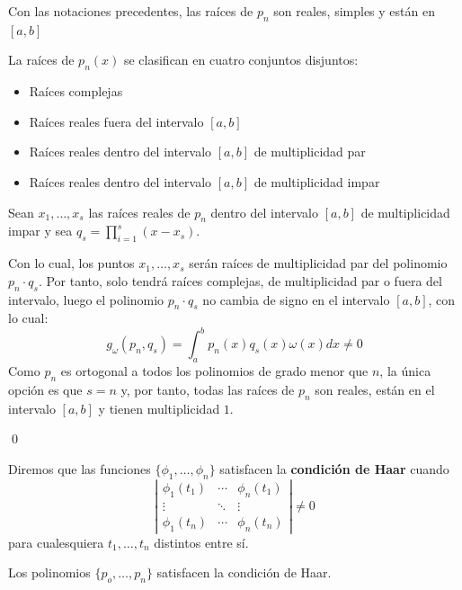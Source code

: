  \begin{prop}
Con las notaciones precedentes, las raíces de $p_n$ son reales, simples y están en $[a,b]$
 \end{prop}
 \begin{dem}
 La raíces de $p_n(x)$ se clasifican en cuatro conjuntos disjuntos: \vspace{-5mm}
 \begin{itemize}
 \item[a)] Raíces complejas
 \item[b)] Raíces reales fuera del intervalo $[a,b]$
 \item[c)] Raíces reales dentro del intervalo $[a,b]$ de multiplicidad par
 \item[d)] Raíces reales dentro del intervalo $[a,b]$ de multiplicidad impar
 \end{itemize}
 Sean $x_1,\ldots,x_s$ las raíces reales de $p_n$ dentro del intervalo $[a,b]$ de multiplicidad impar y sea $q_s=\prod_{i=1}^s(x-x_s)$.
 
 Con lo cual, los puntos $x_1,\ldots,x_s$ serán raíces de multiplicidad par del polinomio $p_{n}\cdot q_s$. Por tanto, solo tendrá raíces complejas, de multiplicidad par o fuera del intervalo, luego el polinomio $p_{n}\cdot q_s$ no cambia de signo en el intervalo $[a,b]$, con lo cual:
 $$g_{\omega}(p_n,q_s)=\int_{a}^bp_n(x)q_s(x)\omega(x)dx\neq 0$$
 Como $p_n$ es ortogonal a todos los polinomios de grado menor que $n$, la única opción es que $s=n$ y, por tanto, todas las raíces de $p_n$ son reales, están en el intervalo $[a,b]$ y tienen multiplicidad $1$.
 
 \qed\end{dem}
 \begin{defin}
    Diremos que las funciones $\{\phi_1,\ldots,\phi_n\}$ satisfacen la \textbf{condición de Haar} cuando
    $$\left|\begin{array}{ccc}
      \phi_1(t_1)&\cdots   &\phi_n(t_1)  \\
        \vdots &\ddots&\vdots \\
         \phi_1(t_n)&\cdots   &\phi_n(t_n)
    \end{array}\right|\neq 0$$
    para cualesquiera $t_1,\ldots,t_n$ distintos entre sí.
 \end{defin}
 \begin{prop}
Los polinomios $\{p_o,\ldots,p_n\}$ satisfacen la condición de Haar.
 \end{prop}

